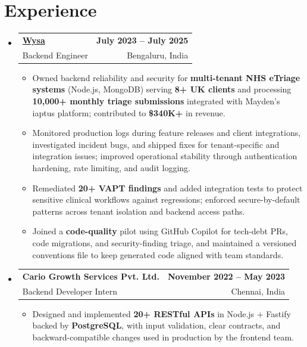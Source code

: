\documentclass[letterpaper,10pt]{article}
\makeatletter
\newcommand{\resumeItem}[1]{
  \item\small{#1\vspace{-1pt}}
}
\newcommand{\resumeSubheading}[4]{
  \vspace{1pt}\item
    \begin{tabular*}{0.985\textwidth}[t]{l@{\extracolsep{\fill}}r}
      \textbf{#1} & \textbf{\small #2} \\
      {\small\color{ResumeSlate} #3} & {\small\color{ResumeSlate} #4} \\
    \end{tabular*}\vspace{-6pt}
}
\newcommand{\resumeSubHeadingListStart}{\begin{itemize}[leftmargin=0.0in, label={}, itemsep=2pt, topsep=2pt]}
\newcommand{\resumeSubHeadingListEnd}{\end{itemize}}
\newcommand{\resumeItemListStart}{\begin{itemize}[leftmargin=0.18in, itemsep=2pt, topsep=1pt]}
\newcommand{\resumeItemListEnd}{\end{itemize}\vspace{-4pt}}
\makeatother
\begin{document}
\section{Experience}
\resumeSubHeadingListStart
  \resumeSubheading
    {\href{https://www.wysa.io}{Wysa}}{July 2023 -- July 2025}
    {Backend Engineer}{Bengaluru, India}
    \resumeItemListStart
      \resumeItem{Owned backend reliability and security for \textbf{multi-tenant NHS eTriage systems} (Node.js, MongoDB) serving \textbf{8+ UK clients} and processing \textbf{10{,}000+ monthly triage submissions} integrated with Mayden's iaptus platform; contributed to \textbf{\$340K+} in revenue.}
      \resumeItem{Monitored production logs during feature releases and client integrations, investigated incident bugs, and shipped fixes for tenant-specific and integration issues; improved operational stability through authentication hardening, rate limiting, and audit logging.}
      \resumeItem{Remediated \textbf{20+ VAPT findings} and added integration tests to protect sensitive clinical workflows against regressions; enforced secure-by-default patterns across tenant isolation and backend access paths.}
      \resumeItem{Joined a \textbf{code-quality} pilot using GitHub Copilot for tech-debt PRs, code migrations, and security-finding triage, and maintained a versioned conventions file to keep generated code aligned with team standards.}
    \resumeItemListEnd
  \resumeSubheading
    {Cario Growth Services Pvt. Ltd.}{November 2022 -- May 2023}
    {Backend Developer Intern}{Chennai, India}
    \resumeItemListStart
      \resumeItem{Designed and implemented \textbf{20+ RESTful APIs} in Node.js + Fastify backed by \textbf{PostgreSQL}, with input validation, clear contracts, and backward-compatible changes used in production by the frontend team.}
    \resumeItemListEnd
\resumeSubHeadingListEnd
\vspace{-4pt}
\end{document}

